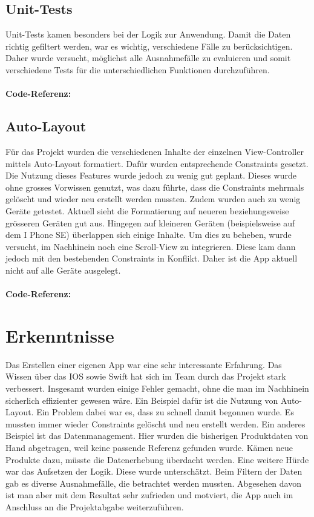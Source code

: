 \documentclass[12pt,titlepage]{article}
\begin{document}
\subsection{Unit-Tests}
Unit-Tests kamen besonders bei der Logik zur Anwendung. Damit die Daten richtig gefiltert werden, war es wichtig, verschiedene Fälle zu berücksichtigen. Daher wurde versucht, möglichst alle Ausnahmefälle zu evaluieren und somit verschiedene Tests für die unterschiedlichen Funktionen durchzuführen.\\
\\
\textbf{Code-Referenz: }\\ 

\subsection{Auto-Layout}
Für das Projekt wurden die verschiedenen Inhalte der einzelnen View-Controller mittels Auto-Layout formatiert. Dafür wurden entsprechende Constraints gesetzt. Die Nutzung dieses Features wurde jedoch zu wenig gut geplant. Dieses wurde ohne grosses Vorwissen genutzt, was dazu führte, dass die Constraints mehrmals gelöscht und wieder neu erstellt werden mussten. Zudem wurden auch zu wenig Geräte getestet. Aktuell sieht die Formatierung auf neueren beziehungsweise grösseren Geräten gut aus. Hingegen auf kleineren Geräten (beispielsweise auf dem I Phone SE) überlappen sich einige Inhalte. Um dies zu beheben, wurde versucht, im Nachhinein noch eine Scroll-View zu integrieren. Diese kam dann jedoch mit den bestehenden Constraints in Konflikt. Daher ist die App aktuell nicht auf alle Geräte ausgelegt.\\
\\
\textbf{Code-Referenz: }\\ 

\section{Erkenntnisse}
Das Erstellen einer eigenen App war eine sehr interessante Erfahrung. Das Wissen über das IOS sowie Swift hat sich im Team durch das Projekt stark verbessert. Insgesamt wurden einige Fehler gemacht, ohne die man im Nachhinein sicherlich effizienter gewesen wäre. Ein Beispiel dafür ist die Nutzung von Auto-Layout. Ein Problem dabei war es, dass zu schnell damit begonnen wurde. Es mussten immer wieder Constraints gelöscht und neu erstellt werden. Ein anderes Beispiel ist das Datenmanagement. Hier wurden die bisherigen Produktdaten von Hand abgetragen, weil keine passende Referenz gefunden wurde. Kämen neue Produkte dazu, müsste die Datenerhebung überdacht werden. Eine weitere Hürde war das Aufsetzen der Logik. Diese wurde unterschätzt. Beim Filtern der Daten gab es diverse Ausnahmefälle, die betrachtet werden mussten. Abgesehen davon ist man aber mit dem Resultat sehr zufrieden und motviert, die App auch im Anschluss an die Projektabgabe weiterzuführen.
\end{document}
